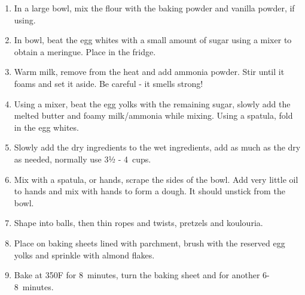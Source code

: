\begin{enumerate}
    \item In a large bowl, mix the flour with the baking powder and vanilla powder, if using.
    \item In bowl, beat the egg whites with a small amount of sugar using a mixer to obtain a meringue. Place in the fridge.
    \item Warm milk, remove from the heat and add ammonia powder. Stir until it foams and set it aside. Be careful - it smells strong!
    \item Using a mixer, beat the egg yolks with the remaining sugar, slowly add the melted butter and foamy milk/ammonia while mixing. Using a spatula, fold in the egg whites.
    \item Slowly add the dry ingredients to the wet ingredients, add as much as the dry as needed, normally use 3½ - 4~cups.
    \item Mix with a spatula, or hands, scrape the sides of the bowl. Add very little oil to hands and mix with hands to form a dough. It should unstick from the bowl.
    \item Shape into balls, then thin ropes and twists, pretzels and koulouria.
    \item Place on baking sheets lined with parchment, brush with the reserved egg yolks and sprinkle with almond flakes.
    \item Bake at 350\degree F for 8~minutes, turn the baking sheet and for another 6-8~minutes.
\end{enumerate}

